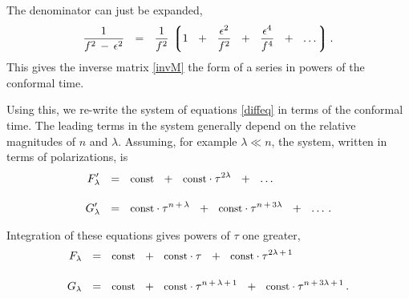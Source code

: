 \documentclass[12pt]{article}
\def\beq{\begin{equation}}
\def\eeq{\end{equation}}
\newcommand{\ph}{\phantom}
\newcommand{\lgr}{\left\lgroup}
\newcommand{\rgr}{\right\rgroup}
\begin{document}
	The denominator can just be expanded,
\beq
	\frac{1}{f^2 \,-\, \epsilon^2}    ~~=~~    
		\frac{1}{f^2}\, 
		\lgr  1  ~~+~~  \frac{\epsilon^2}{f^2}  ~~+~~  \frac{\epsilon^4}{f^4}  ~~+~~  \dots \rgr.
\eeq
	This gives the inverse matrix \eqref{invM} the form of a series in powers of the conformal time.
	
	Using this, we re-write the system of equations \eqref{diffeq} in terms of the conformal time.
	The leading terms in the system generally depend on the relative magnitudes of $ n $ and $ \lambda $.
	Assuming, for example $ \lambda \ll n $, the system, written in terms of polarizations, is
\begin{align}
%
\notag
	F_\lambda^\prime    & ~~=~~    \text{\small const}  ~~+~~  \text{\small const} \cdot \tau^{2 \lambda}  ~~+~~  \dots
	\\[3.4mm]
%
	G_\lambda^\prime    & ~~=~~    \text{\small const} \cdot \tau^{n \,+\, \lambda}  ~~+~~  \text{\small const} \cdot \tau^{n \,+\, 3\lambda}
					~~+~~  \dots\,.
\end{align}

%	
%

	Integration of these equations gives powers of $ \tau $ one greater,
\begin{align}
%
\notag
	F_\lambda    & ~~=~~    \text{\small const}  ~~+~~  \text{\small const} \cdot \tau  ~~+~~  \text{\small const} \cdot \tau^{2 \lambda \,+\, 1} 
	\\[3.8mm]
%
\label{syssol}
	G_\lambda    & ~~=~~    \text{\small const}  ~~+~~  
				\text{\small const} \cdot \tau^{n \,+\, \lambda \,+\, 1}  ~~+~~  \text{\small const} \cdot \tau^{n \,+\, 3 \lambda \,+\, 1}\,.
\end{align}
\end{document}

